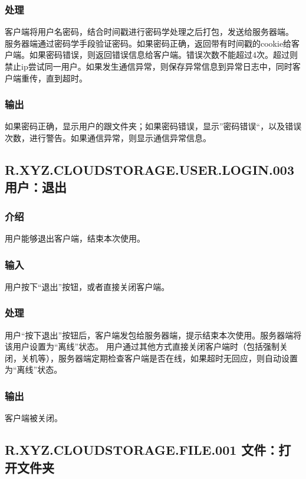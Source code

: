 \subsubsection{处理}
客户端将用户名密码，结合时间戳进行密码学处理之后打包，发送给服务器端。
服务器端通过密码学手段验证密码。如果密码正确，返回带有时间戳的cookie给客户端。如果密码错误，则返回错误信息给客户端。错误次数不能超过4次。超过则禁止ip尝试同一用户。如果发生通信异常，则保存异常信息到异常日志中，同时客户端重传，直到超时。

\subsubsection{输出}
如果密码正确，显示用户的跟文件夹；如果密码错误，显示”密码错误“，以及错误次数，进行警告。如果通信异常，则显示通信异常信息。

\subsection{R.XYZ.CLOUDSTORAGE.USER.LOGIN.003 用户：退出 }

\subsubsection{介绍}
用户能够退出客户端，结束本次使用。

\subsubsection{输入}
用户按下“退出”按钮，或者直接关闭客户端。

\subsubsection{处理}
用户“按下退出”按钮后，客户端发包给服务器端，提示结束本次使用。服务器端将该用户设置为“离线”状态。
用户通过其他方式直接关闭客户端时（包括强制关闭，关机等），服务器端定期检查客户端是否在线，如果超时无回应，则自动设置为“离线”状态。

\subsubsection{输出}
客户端被关闭。

\subsection{R.XYZ.CLOUDSTORAGE.FILE.001 文件：打开文件夹}

